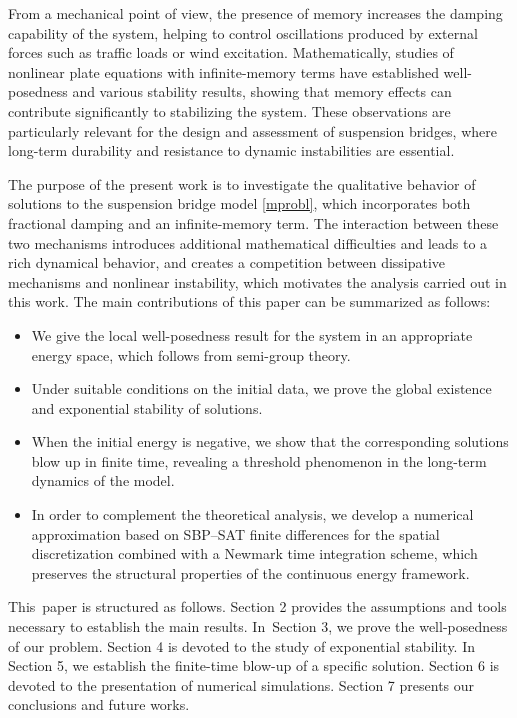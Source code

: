 \documentclass[12pt]{article}
\numberwithin{equation}{section}
\begin{document}
From a mechanical point of view, the presence of memory increases the damping
capability of the system, helping to control oscillations produced by external forces
such as traffic loads or wind excitation. Mathematically, studies of nonlinear plate
equations with infinite-memory terms have established well-posedness and various
stability results, showing that memory effects can contribute significantly to
stabilizing the system. These observations are particularly relevant for the design
and assessment of suspension bridges, where long-term durability and resistance to
dynamic instabilities are essential.

The purpose of the present work is to investigate the qualitative behavior of
solutions to the suspension bridge model \eqref{mprobl}, which incorporates
both fractional damping and an infinite-memory term. The interaction between
these two mechanisms introduces additional mathematical difficulties and
leads to a rich dynamical behavior, and creates a competition between dissipative mechanisms and nonlinear
instability, which motivates the analysis carried out in this work.
The main contributions of this paper can be summarized as follows:

\begin{itemize}
\item We give the local well-posedness result for the system in an appropriate energy space, which follows from semi-group theory.

\item Under suitable conditions on the initial data, we prove the global
existence and exponential stability of solutions.

\item When the initial energy is negative, we show that the corresponding
solutions blow up in finite time, revealing a threshold phenomenon in the
long-term dynamics of the model.

\item In order to complement the theoretical analysis, we develop a numerical
approximation based on SBP--SAT finite differences for the spatial
discretization combined with a Newmark time integration scheme, which
preserves the structural properties of the continuous energy framework.
\end{itemize}

 This~paper is structured as follows. Section 2 provides the assumptions and tools necessary to establish the main results. In~Section 3, we prove the well-posedness of our problem. Section 4 is devoted to the study of exponential stability. In Section 5, we establish the finite-time blow-up of a specific solution. Section 6 is devoted to the presentation of numerical simulations. Section 7 presents our conclusions and future works.
\end{document}
